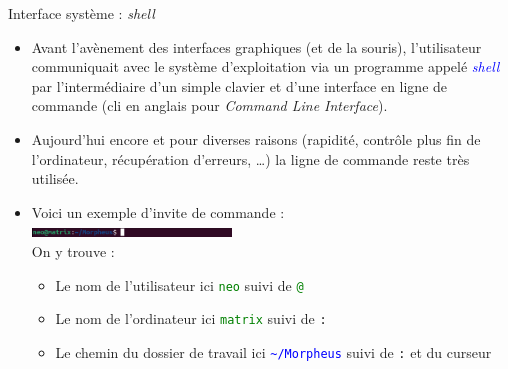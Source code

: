 \documentclass[10pt]{beamer}
\begin{document}
\begin{frame}{\Ctitle}{\stitle}
	\begin{block}{Interface système : \textit{shell}}
		\begin{itemize}
			\item<1-> Avant l'avènement des interfaces graphiques (et de la souris), l'utilisateur communiquait avec le système d’exploitation via un programme appelé \textcolor{blue}{\textit{shell}} par l'intermédiaire d'un simple clavier et d'une interface en ligne de commande ({\sc cli} en anglais pour \textit{Command Line Interface}).
			\item<2-> Aujourd'hui encore et pour diverses raisons (rapidité, contrôle plus fin de l'ordinateur, récupération d'erreurs, \dots) la ligne de commande reste très utilisée.
			\item<3-> Voici un exemple d'invite de commande :\\
				\includegraphics[width=200px]{neo.eps} \\
				On y trouve :
				\begin{itemize}
					\item<4-> Le nom de l'utilisateur ici \textcolor{green}{\tt neo} suivi de \textcolor{green}{\tt @}
					\item<5-> Le nom de l'ordinateur ici \textcolor{green}{\tt matrix} suivi de {\tt :}
					\item<6-> Le chemin du dossier de travail ici \textcolor{blue}{\tt \~{}/Morpheus}  suivi de {\tt :} et du curseur
				\end{itemize}
		\end{itemize}
	\end{block}
\end{frame}
\end{document}
